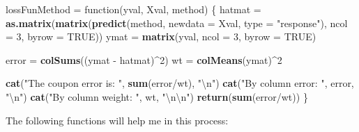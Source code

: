 \documentclass[10pt]{report}
\newenvironment{Shaded}{}{}
\newcommand{\KeywordTok}[1]{\textcolor[rgb]{0.00,0.44,0.13}{\textbf{{#1}}}}
\newcommand{\DataTypeTok}[1]{\textcolor[rgb]{0.56,0.13,0.00}{{#1}}}
\newcommand{\DecValTok}[1]{\textcolor[rgb]{0.25,0.63,0.44}{{#1}}}
\newcommand{\CharTok}[1]{\textcolor[rgb]{0.25,0.44,0.63}{{#1}}}
\newcommand{\StringTok}[1]{\textcolor[rgb]{0.25,0.44,0.63}{{#1}}}
\newcommand{\OtherTok}[1]{\textcolor[rgb]{0.00,0.44,0.13}{{#1}}}
\newcommand{\NormalTok}[1]{{#1}}
\begin{document}
\begin{Shaded}
\begin{Highlighting}[]
\NormalTok{lossFunMethod =}\StringTok{ }\NormalTok{function(yval, Xval, method) \{}
    \NormalTok{hatmat =}\StringTok{ }\KeywordTok{as.matrix}\NormalTok{(}\KeywordTok{matrix}\NormalTok{(}\KeywordTok{predict}\NormalTok{(method, }\DataTypeTok{newdata =} \NormalTok{Xval, }\DataTypeTok{type =} \StringTok{"response"}\NormalTok{), }
        \DataTypeTok{ncol =} \DecValTok{3}\NormalTok{, }\DataTypeTok{byrow =} \OtherTok{TRUE}\NormalTok{))}
    \NormalTok{ymat =}\StringTok{ }\KeywordTok{matrix}\NormalTok{(yval, }\DataTypeTok{ncol =} \DecValTok{3}\NormalTok{, }\DataTypeTok{byrow =} \OtherTok{TRUE}\NormalTok{)}
    
    \NormalTok{error =}\StringTok{ }\KeywordTok{colSums}\NormalTok{((ymat -}\StringTok{ }\NormalTok{hatmat)^}\DecValTok{2}\NormalTok{)}
    \NormalTok{wt =}\StringTok{ }\KeywordTok{colMeans}\NormalTok{(ymat)^}\DecValTok{2}
    
    \KeywordTok{cat}\NormalTok{(}\StringTok{"The coupon error is:  "}\NormalTok{, }\KeywordTok{sum}\NormalTok{(error/wt), }\StringTok{"}\CharTok{\textbackslash{}n}\StringTok{"}\NormalTok{)}
    \KeywordTok{cat}\NormalTok{(}\StringTok{"By column error:      "}\NormalTok{, error, }\StringTok{"}\CharTok{\textbackslash{}n}\StringTok{"}\NormalTok{)}
    \KeywordTok{cat}\NormalTok{(}\StringTok{"By column weight:     "}\NormalTok{, wt, }\StringTok{"}\CharTok{\textbackslash{}n\textbackslash{}n}\StringTok{"}\NormalTok{)}
    \KeywordTok{return}\NormalTok{(}\KeywordTok{sum}\NormalTok{(error/wt))}
\NormalTok{\}}
\end{Highlighting}
\end{Shaded}

The following functions will help me in this process:
\end{document}
